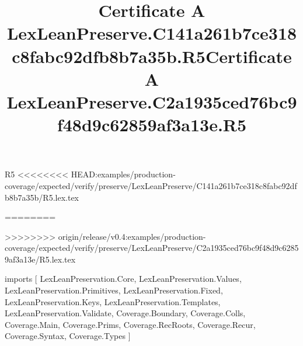 \begin{lexlean}{R5}
<<<<<<<< HEAD:examples/production-coverage/expected/verify/preserve/LexLeanPreserve/C141a261b7ce318c8fabc92dfb8b7a35b/R5.lex.tex
\title{Certificate A LexLeanPreserve.C141a261b7ce318c8fabc92dfb8b7a35b.R5}
========
\title{Certificate A LexLeanPreserve.C2a1935ced76bc9f48d9c62859af3a13e.R5}
>>>>>>>> origin/release/v0.4:examples/production-coverage/expected/verify/preserve/LexLeanPreserve/C2a1935ced76bc9f48d9c62859af3a13e/R5.lex.tex
\begin{coremodule}
imports [
  LexLeanPreservation.Core,
  LexLeanPreservation.Values,
  LexLeanPreservation.Primitives,
  LexLeanPreservation.Fixed,
  LexLeanPreservation.Keys,
  LexLeanPreservation.Templates,
  LexLeanPreservation.Validate,
  Coverage.Boundary,
  Coverage.Colls,
  Coverage.Main,
  Coverage.Prims,
  Coverage.RecRoots,
  Coverage.Recur,
  Coverage.Syntax,
  Coverage.Types
]


\end{coremodule}
\end{lexlean}
